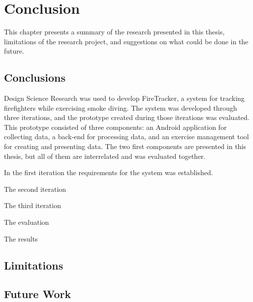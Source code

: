 \documentclass[../Main/thesis.tex]{subfiles}
\begin{document}
\chapter{Conclusion}
\label{ch:conclusion}
This chapter presents a summary of the research presented in this thesis, limitations of the research project, and suggestions on what could be done in the future.

\section{Conclusions}
Design Science Research was used to develop FireTracker, a system for tracking firefighters while exercising smoke diving.
The system was developed through three iterations, and the prototype created during those iterations was evaluated.
This prototype consisted of three components: an Android application for collecting data, a back-end for processing data, and an exercise management tool for creating and presenting data.
The two first components are presented in this thesis, but all of them are interrelated and was evaluated together.

In the first iteration the requirements for the system was established. 

The second iteration

The third iteration

The evaluation

The results

\section{Limitations}

\section{Future Work}
\end{document}
